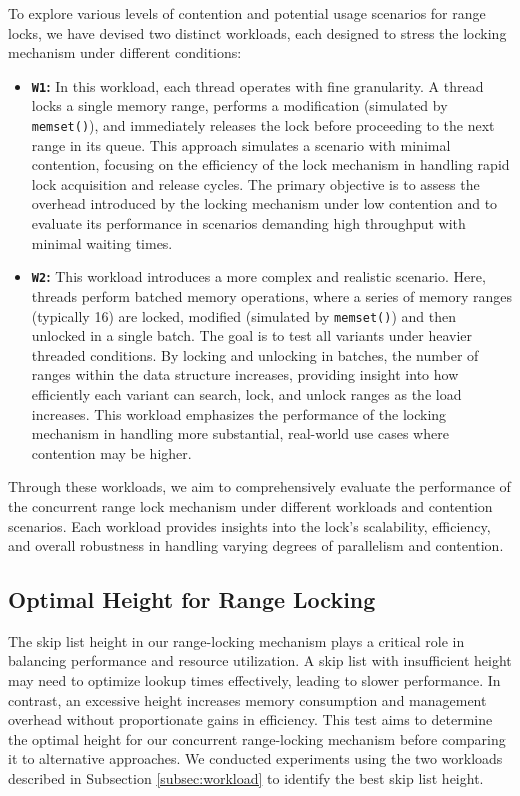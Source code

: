 To explore various levels of contention and potential usage scenarios for range locks, we have devised two distinct workloads, each designed to stress the locking mechanism under different conditions:

\begin{itemize} 
    \item \textbf{\texttt{W1}:} In this workload, each thread operates with fine granularity. 
    A thread locks a single memory range, performs a modification (simulated by \texttt{memset()}), and immediately releases the lock before proceeding to the next range in its queue. 
    This approach simulates a scenario with minimal contention, focusing on the efficiency of the lock mechanism in handling rapid lock acquisition and release cycles. 
    The primary objective is to assess the overhead introduced by the locking mechanism under low contention and to evaluate its performance in scenarios demanding high throughput with minimal waiting times.
    
    \item \textbf{\texttt{W2}:} This workload introduces a more complex and realistic scenario. 
    Here, threads perform batched memory operations, where a series of memory ranges (typically 16) are locked, modified (simulated by \texttt{memset()}) and then unlocked in a single batch. 
    The goal is to test all variants under heavier threaded conditions. 
    By locking and unlocking in batches, the number of ranges within the data structure increases, providing insight into how efficiently each variant can search, lock, and unlock ranges as the load increases. 
    This workload emphasizes the performance of the locking mechanism in handling more substantial, real-world use cases where contention may be higher.
\end{itemize}

Through these workloads, we aim to comprehensively evaluate the performance of the concurrent range lock mechanism under different workloads and contention scenarios. 
Each workload provides insights into the lock's scalability, efficiency, and overall robustness in handling varying degrees of parallelism and contention.

\subsection{Optimal Height for Range Locking}

The skip list height in our range-locking mechanism plays a critical role in balancing performance and resource utilization. 
A skip list with insufficient height may need to optimize lookup times effectively, leading to slower performance. 
In contrast, an excessive height increases memory consumption and management overhead without proportionate gains in efficiency. 
This test aims to determine the optimal height for our concurrent range-locking mechanism before comparing it to alternative approaches. 
We conducted experiments using the two workloads described in Subsection \ref{subsec:workload} to identify the best skip list height.

